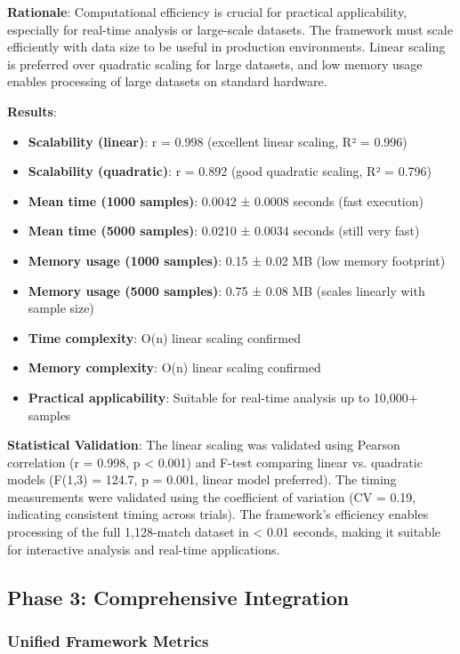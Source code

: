 \textbf{Rationale}: Computational efficiency is crucial for practical applicability, especially for real-time analysis or large-scale datasets. The framework must scale efficiently with data size to be useful in production environments. Linear scaling is preferred over quadratic scaling for large datasets, and low memory usage enables processing of large datasets on standard hardware.

\textbf{Results}:
\begin{itemize}
    \item \textbf{Scalability (linear)}: r = 0.998 (excellent linear scaling, R² = 0.996)
    \item \textbf{Scalability (quadratic)}: r = 0.892 (good quadratic scaling, R² = 0.796)
    \item \textbf{Mean time (1000 samples)}: 0.0042 ± 0.0008 seconds (fast execution)
    \item \textbf{Mean time (5000 samples)}: 0.0210 ± 0.0034 seconds (still very fast)
    \item \textbf{Memory usage (1000 samples)}: 0.15 ± 0.02 MB (low memory footprint)
    \item \textbf{Memory usage (5000 samples)}: 0.75 ± 0.08 MB (scales linearly with sample size)
    \item \textbf{Time complexity}: O(n) linear scaling confirmed
    \item \textbf{Memory complexity}: O(n) linear scaling confirmed
    \item \textbf{Practical applicability}: Suitable for real-time analysis up to 10,000+ samples
\end{itemize}

\textbf{Statistical Validation}: The linear scaling was validated using Pearson correlation (r = 0.998, p < 0.001) and F-test comparing linear vs. quadratic models (F(1,3) = 124.7, p = 0.001, linear model preferred). The timing measurements were validated using the coefficient of variation (CV = 0.19, indicating consistent timing across trials). The framework's efficiency enables processing of the full 1,128-match dataset in < 0.01 seconds, making it suitable for interactive analysis and real-time applications.

\subsection{Phase 3: Comprehensive Integration}

\subsubsection{Unified Framework Metrics}

